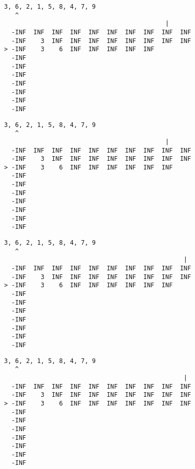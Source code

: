 { \begin{verbatim}
3, 6, 2, 1, 5, 8, 4, 7, 9
   ^
                                            |
  -INF  INF  INF  INF  INF  INF  INF  INF  INF  INF
  -INF    3  INF  INF  INF  INF  INF  INF  INF  INF
> -INF    3    6  INF  INF  INF  INF  INF          
  -INF                                             
  -INF                                             
  -INF                                             
  -INF                                             
  -INF                                             
  -INF                                             
  -INF                                             
\end{verbatim} }

{ \begin{verbatim}
3, 6, 2, 1, 5, 8, 4, 7, 9
   ^
                                            |
  -INF  INF  INF  INF  INF  INF  INF  INF  INF  INF
  -INF    3  INF  INF  INF  INF  INF  INF  INF  INF
> -INF    3    6  INF  INF  INF  INF  INF  INF     
  -INF                                             
  -INF                                             
  -INF                                             
  -INF                                             
  -INF                                             
  -INF                                             
  -INF                                             
\end{verbatim} }

{ \begin{verbatim}
3, 6, 2, 1, 5, 8, 4, 7, 9
   ^
                                                 |
  -INF  INF  INF  INF  INF  INF  INF  INF  INF  INF
  -INF    3  INF  INF  INF  INF  INF  INF  INF  INF
> -INF    3    6  INF  INF  INF  INF  INF  INF     
  -INF                                             
  -INF                                             
  -INF                                             
  -INF                                             
  -INF                                             
  -INF                                             
  -INF                                             
\end{verbatim} }

{ \begin{verbatim}
3, 6, 2, 1, 5, 8, 4, 7, 9
   ^
                                                 |
  -INF  INF  INF  INF  INF  INF  INF  INF  INF  INF
  -INF    3  INF  INF  INF  INF  INF  INF  INF  INF
> -INF    3    6  INF  INF  INF  INF  INF  INF  INF
  -INF                                             
  -INF                                             
  -INF                                             
  -INF                                             
  -INF                                             
  -INF                                             
  -INF                                             
\end{verbatim} }

